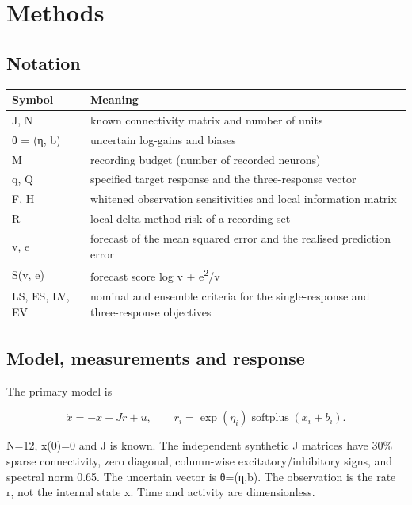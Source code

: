 \section{Methods}

\subsection{Notation}

\begin{center}

\centering\small
\begin{tabular*}{\textwidth}{@{\extracolsep{\fill}}ll}
\toprule
Symbol & Meaning \\
\midrule
J, N & known connectivity matrix and number of units \\
θ = (η, b) & uncertain log-gains and biases \\
M & recording budget (number of recorded neurons) \\
q, Q & specified target response and the three-response vector \\
F, H & whitened observation sensitivities and local information matrix \\
R & local delta-method risk of a recording set \\
v, e & forecast of the mean squared error and the realised prediction error \\
S(v, e) & forecast score log v + e\textsuperscript{2}/v \\
LS, ES, LV, EV & nominal and ensemble criteria for the single-response and three-response objectives \\
\bottomrule
\end{tabular*}
\end{center}

\subsection{Model, measurements and response}

The primary model is

\begin{equation}
\dot x=-x+Jr+u,\qquad
r_i=\exp(\eta_i)\operatorname{softplus}(x_i+b_i).
\end{equation}

N=12, x(0)=0 and J is known. The independent synthetic J matrices have 30\% sparse connectivity, zero diagonal, column-wise excitatory/inhibitory signs, and spectral norm 0.65. The uncertain vector is θ=(η,b). The observation is the rate r, not the internal state x. Time and activity are dimensionless.

